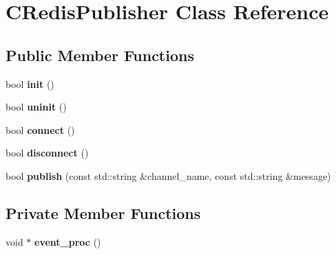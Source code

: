 \hypertarget{classCRedisPublisher}{}\section{C\+Redis\+Publisher Class Reference}
\label{classCRedisPublisher}
\subsection*{Public Member Functions}
\begin{DoxyCompactItemize}
\item 
\mbox{\label{classCRedisPublisher_ac133099f447b301fa406f43e53d2fcb7}} 
bool {\bfseries init} ()
\item 
\mbox{\label{classCRedisPublisher_a023c98d3b0d2bbd6bd0e9d6c038f4fcf}} 
bool {\bfseries uninit} ()
\item 
\mbox{\label{classCRedisPublisher_ae042c9b8e0aa35d831f407add0d5a09d}} 
bool {\bfseries connect} ()
\item 
\mbox{\label{classCRedisPublisher_aa359b52013c6120445631fa89902613d}} 
bool {\bfseries disconnect} ()
\item 
\mbox{\label{classCRedisPublisher_a4e8b402ae6b39806424c37e74598b242}} 
bool {\bfseries publish} (const std\+::string \&channel\+\_\+name, const std\+::string \&message)
\end{DoxyCompactItemize}
\subsection*{Private Member Functions}
\begin{DoxyCompactItemize}
\item 
\mbox{\label{classCRedisPublisher_ac9333f0b59f7779fb803fc12020680df}} 
void $\ast$ {\bfseries event\+\_\+proc} ()
\end{DoxyCompactItemize}
